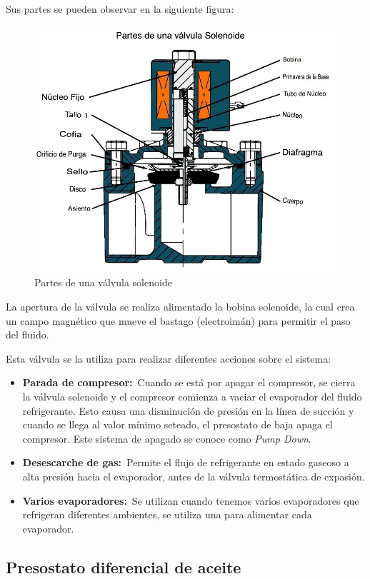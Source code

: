 Sus partes se pueden observar en la siguiente figura:
\begin{figure}[H]
    \centering
    \includegraphics[width=0.6\linewidth]{figuras/control-seguridad/valvula-soleinoide.jpg}
    \caption{Partes de una v\'alvula solenoide}
    \label{fig:partes-valvula-solenoide}
\end{figure}

La apertura de la v\'alvula se realiza alimentado la bobina solenoide, la cual crea un campo magn\'etico que mueve el bastago (electroim\'an) para permitir el paso del fluido.

Esta v\'alvula se la utiliza para realizar diferentes acciones sobre el sistema:

\begin{itemize}
    \item \textbf{Parada de compresor:}\ Cuando se est\'a por apagar el compresor, se cierra la v\'alvula solenoide y el compresor comienza a vaciar el evaporador del fluido refrigerante. Esto causa una disminuci\'on de presi\'on en la l\'inea de succi\'on y cuando se llega al valor m\'inimo seteado, el presostato de baja apaga el compresor. Este sistema de apagado se conoce como \textit{Pump Down}.
    \item \textbf{Desescarche de gas:}\ Permite el flujo de refrigerante en estado gaseoso a alta presi\'on hacia el evaporador, antes de la v\'alvula termost\'atica de expasi\'on.
    \item \textbf{Varios evaporadores:}\ Se utilizan cuando tenemos varios evaporadores que refrigeran diferentes ambientes, se utiliza una para alimentar cada evaporador.
\end{itemize}

\subsection{Presostato diferencial de aceite}

